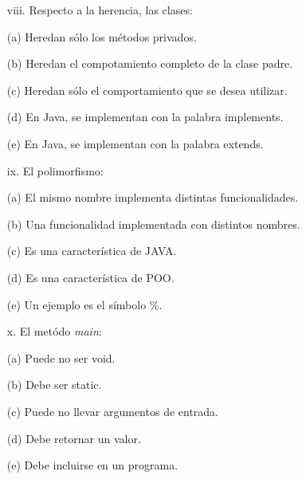 \documentclass[10pt]{article}
\begin{document}
\begin{enumerate}
{\begin{multicols}{2}
    \begin{enumerate}[label=(\alph*)]
        \item[viii.] Respecto a la herencia, las clases:
        \item[(a)] Heredan s\'olo los m\'etodos privados.
        \item[(b)] Heredan el compotamiento completo de la clase padre.
        \item[(c)] Heredan s\'olo el comportamiento que se desea utilizar.
        \item[(d)] En Java, se implementan con la palabra implements.
        \item[(e)] En Java, se implementan con la palabra extends.
    \end{enumerate}

    \begin{enumerate}[label=(\alph*)]
        \item[ix.] El polimorfismo: 
        \item[(a)] El mismo nombre implementa distintas funcionalidades.
        \item[(b)] Una funcionalidad implementada con distintos nombres.
        \item[(c)] Es una caracter\'istica de JAVA.
        \item[(d)] Es una caracter\'istica de POO.
        \item[(e)] Un ejemplo es el s\'imbolo \%.
    \end{enumerate}

    \begin{enumerate}[label=(\alph*)]
        \item[x.] El met\'odo \emph{main}:
        \item[(a)] Puede no ser void.
        \item[(b)] Debe ser static.
        \item[(c)] Puede no llevar argumentos de entrada.
        \item[(d)] Debe retornar un valor.
        \item[(e)] Debe incluirse en un programa.
    \end{enumerate}


\end{multicols}}
\end{enumerate}
\end{document}
